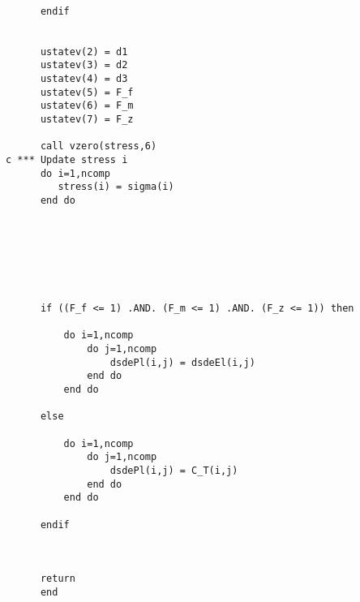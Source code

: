 \begin{lstlisting}
            
      endif
      

      ustatev(2) = d1
      ustatev(3) = d2
      ustatev(4) = d3
      ustatev(5) = F_f
      ustatev(6) = F_m
      ustatev(7) = F_z

      call vzero(stress,6)
c *** Update stress i
      do i=1,ncomp
         stress(i) = sigma(i)
      end do
      
      
 

      

      
      if ((F_f <= 1) .AND. (F_m <= 1) .AND. (F_z <= 1)) then
          
          do i=1,ncomp
              do j=1,ncomp
                  dsdePl(i,j) = dsdeEl(i,j)        
              end do
          end do 
      
      else
          
          do i=1,ncomp
              do j=1,ncomp
                  dsdePl(i,j) = C_T(i,j)        
              end do
          end do 
          
      endif  
      
      
      
      return
      end

	
\end{lstlisting}

              
              
              
              
              
              
              
              
              
              
              
              
              
              
              
              
              
              
              
              
              
              
              
              
              
              
              
              
              
              
              

      

      
      
      
      

